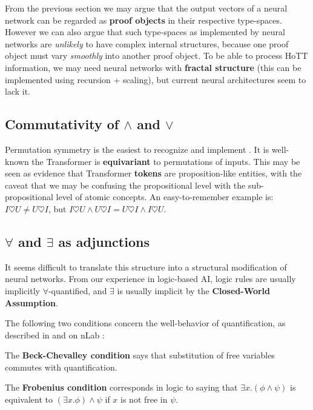 \documentclass[runningheads]{llncs}
\begin{document}
From the previous section we may argue that the output vectors of a neural network can be regarded as \textbf{proof objects} in their respective type-spaces.  However we can also argue that such type-spaces as implemented by neural networks are \textit{unlikely} to have complex internal structures, because one proof object must vary \textit{smoothly} into another proof object.  To be able to process HoTT information, we may need neural networks with \textbf{fractal structure} (this can be implemented using recursion + scaling), but current neural architectures seem to lack it.

\subsection{Commutativity of $\wedge$ and $\vee$}

Permutation symmetry is the easiest to recognize and implement \cite{Zaheer2017} \cite{Qi2017}.  It is well-known the Transformer \cite{Vaswani2017} is \textbf{equivariant} to permutations of inputs.  This may be seen as evidence that Transformer \textbf{tokens} are proposition-like entities, with the caveat that we may be confusing the propositional level with the sub-propositional level of atomic concepts.  An easy-to-remember example is: $I \heartsuit U \neq U \heartsuit I$, but $I \heartsuit U \wedge U \heartsuit I = U \heartsuit I \wedge I \heartsuit U$.

\subsection{$\forall$ and $\exists$ as adjunctions}

It seems difficult to translate this structure into a structural modification of neural networks.  From our experience in logic-based AI, logic rules are usually implicitly $\forall$-quantified, and $\exists$ is usually implicit by the \textbf{Closed-World Assumption}.

The following two conditions concern the well-behavior of quantification, as described in \cite{Jacobs1999} and on nLab \cite{nLab-beck-chevalley} \cite{nLab-Frobenius}:

\noindent The \textbf{Beck-Chevalley condition} says that substitution of free variables commutes with quantification.

\noindent The \textbf{Frobenius condition} corresponds in logic to saying that $\exists x. (\phi \wedge \psi)$ is equivalent to $(\exists x. \phi) \wedge \psi$ if $x$ is not free in $\psi$.
\end{document}
